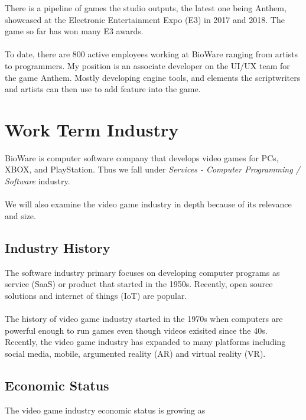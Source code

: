 \documentclass[10pt,letterpaper]{article}
\begin{document}
There is a pipeline of games the studio outputs, the latest one being Anthem, showcased at the Electronic Entertainment Expo (E3) in 2017 and 2018. The game so far has won many E3 awards.\\
\\
To date, there are 800 active employees working at BioWare ranging from artists to programmers. My position is an associate developer on the UI/UX team for the game Anthem. Mostly developing engine tools, and elements the scriptwriters and artists can then use to add feature into the game. \\

\clearpage
\section{Work Term Industry}\label{work-term-industry}

BioWare is computer software company that develops video games for PCs, XBOX, and PlayStation. Thus we fall under \textit{Services - Computer Programming / Software} industry.\\
\\
We will also examine the video game industry in depth because of its relevance and size. \\

\subsection{Industry History}

The software industry primary focuses on developing computer programs as service (SaaS) or product that started in the 1950s. Recently, open source solutions and internet of things (IoT) are popular.\cite{software-industry}\\
\\
The history of video game industry started in the 1970s when computers are powerful enough to run games even though videos exisited since the 40s. Recently, the video game industry has expanded to many platforms including social media, mobile, argumented reality (AR) and virtual reality (VR).\cite{video-game-industry-wiki}\cite{video-game-industry-stats}\\

\subsection{Economic Status}

The video game industry economic status is growing as 
\end{document}
